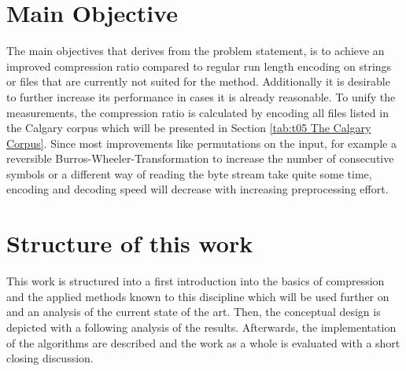 \section{Main Objective}
\label{ch:Introduction:sec:Main Objective}
\par{
The main objectives that derives from the problem statement, is to achieve an improved compression ratio compared to regular run length encoding on strings or files that are currently not suited for the method. Additionally it is desirable to further increase its performance in cases it is already reasonable. To unify the measurements, the compression ratio is calculated by encoding all files listed in the Calgary corpus which will be presented in Section \ref{tab:t05 The Calgary Corpus}. Since most improvements like permutations on the input, for example a reversible Burros-Wheeler-Transformation to increase the number of consecutive symbols or a different way of reading the byte stream take quite some time, encoding and decoding speed will decrease with increasing preprocessing effort.
}
\section{Structure of this work}
\label{ch:Intoduction:sec:Structure}
\par{
This work is structured into a first introduction into the basics of compression and the applied methods known to this discipline which will be used further on and an analysis of the current state of the art. Then, the conceptual design is depicted with a following analysis of the results. Afterwards, the implementation of the algorithms are described and the work as a whole is evaluated with a short closing discussion.  
}
